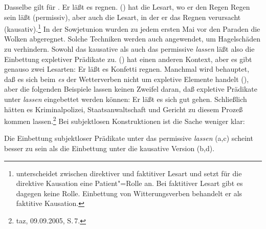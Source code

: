 \eal
{}
\zl
Dasselbe gilt für .
\ea
\label{bsp-er-laesst-es-regnen}
Er läßt es regnen.
\z
() hat die Lesart, wo er den Regen Regen sein läßt (permissiv), aber auch die
Lesart, in der er das Regnen verursacht (kausativ).\footnote{
        \citet[]{Gunkel2003b} unterscheidet zwischen direktiver und
        faktitiver Lesart und setzt für die direktive Kausation eine Patient"=Rolle
        an. Bei faktitiver Lesart gibt es dagegen keine Rolle. Einbettung
        von Witterungsverben behandelt er als faktitive Kausation.%
}
In der Sowjetunion wurden zu jedem ersten Mai vor den Paraden die Wolken abgeregnet.
Solche Techniken werden auch angewendet, um Hagelschäden zu verhindern.
Sowohl das kausative als auch das permissive \emph{lassen} läßt also die
Einbettung expletiver Prädikate zu.
() hat einen anderen Kontext, aber es gibt genauso zwei Lesarten:
\ea
Er läßt es Konfetti regnen.
\z
Manchmal wird behauptet, daß es sich beim \emph{es} der Wetterverben
nicht um expletive Elemente handelt (\citealp[]{Paul1919a}),
aber die folgenden Beispiele lassen keinen Zweifel daran, daß expletive Prädikate unter
\emph{lassen} eingebettet werden können:
\eal
\ex Er läßt es        sich gut  gehen.
\ex Schließlich hätten es Kriminalpolizei, Staatsanwaltschaft und Gericht zu diesem Prozeß kommen lassen.\footnote{
  taz, 09.09.2005, S.\,7.
}
\zl
%
Bei subjektlosen Konstruktionen ist die Sache weniger klar:

\eal
{}
\zl
Die Einbettung subjektloser Prädikate unter das permissive \emph{lassen} (a,c)
scheint besser zu sein als die Einbettung unter die kausative Version (b,d).

